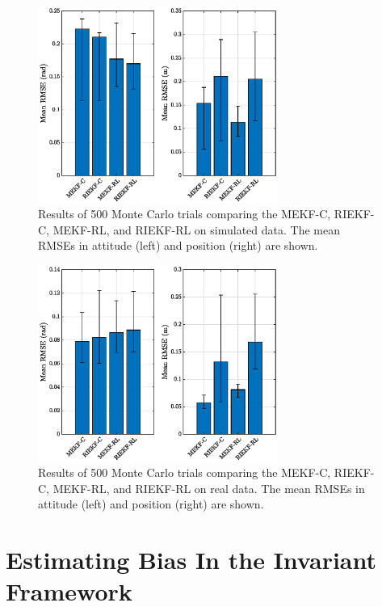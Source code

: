 \begin{figure}
	\centering
	\includegraphics[width=0.7\textwidth]{figs/se3/real/comp_diff_state_sim.eps}
	\caption[Results comparing the MEKF-C, RIEKF-C, MEKF-RL, and RIEKF-RL on simulated data.]{Results of 500 Monte Carlo trials comparing the MEKF-C, RIEKF-C, MEKF-RL, and RIEKF-RL on simulated data. The mean RMSEs in attitude (left) and position (right) are shown.}
	\label{fig:se3_comp_real_sim}
\end{figure}
\begin{figure}
	\centering
	\includegraphics[width=0.7\textwidth]{figs/se3/real/comp_diff_state_Real.eps}
	\caption[Results comparing the MEKF-C, RIEKF-C, MEKF-RL, and RIEKF-RL on real data.]{Results of 500 Monte Carlo trials comparing the MEKF-C, RIEKF-C, MEKF-RL, and RIEKF-RL on real data. The mean RMSEs in attitude (left) and position (right) are shown.}
	\label{fig:se3_comp_real}
\end{figure}

\FloatBarrier

\section{Estimating Bias In the Invariant Framework}

